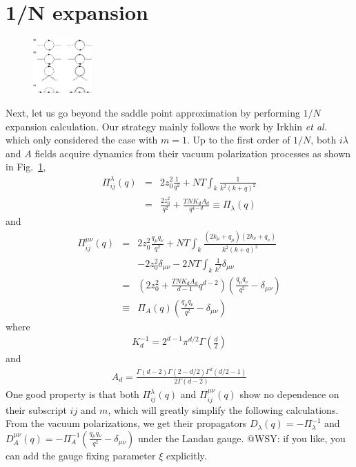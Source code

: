 \documentclass[aps,twocolumn,superscriptaddress]{revtex4-1}
\newcommand{\bea}{\begin{eqnarray}}
\newcommand{\eea}{\end{eqnarray}}
\newcommand{\etal}{\textit{et al.{ }}}
\begin{document}
\section{1/N expansion}
\begin{figure}
\includegraphics[width=0.2\textwidth]{self.eps}
\caption{\label{fig:self}}
\end{figure}
Next, let us go
beyond the saddle point approximation by performing $1/N$ expansion calculation. Our strategy mainly follows the work by
Irkhin \etal \cite{irkhin1996} which only considered the case with $m=1$. Up to the first order of $1/N$, both
$i\lambda$ and $A$ fields acquire dynamics from their vacuum polarization processes as shown in Fig.~\ref{fig:self},
\bea \Pi_{ij}^\lambda(q)&=&2z_0^2\frac{1}{q^2} + NT\int_k \frac{1}{k^2(k+q)^2} \nonumber\\
                        &=&\frac{2z_0^2}{q^2}+\frac{TNK_dA_d}{q^{4-d}} \equiv \Pi_\lambda(q) \eea and \bea
\Pi_{ij}^{\mu\nu}(q) &=& 2z_0^2 \frac{q_\mu q_\nu}{q^2} + NT\int_k \frac{(2k_\mu+q_\mu)(2k_\nu+q_\nu)}{k^2(k+q)^2}
\nonumber\\ && - 2z_0^2 \delta_{\mu\nu} -2NT\int_k \frac{1}{k^2}\delta_{\mu\nu}  \nonumber\\
            &=&\left(2z_0^2+\frac{TNK_dA_d}{d-1} q^{d-2}\right)\left(\frac{q_\mu q_\nu}{q^2}-\delta_{\mu\nu}\right)
\nonumber\\ &\equiv& \Pi_A(q)\left(\frac{q_\mu q_\nu}{q^2}-\delta_{\mu\nu}\right) \eea where \bea
K_d^{-1}=2^{d-1}\pi^{d/2}\Gamma\left(\frac{d}{2}\right) \eea and \bea
A_d=\frac{\Gamma(d-2)\Gamma(2-d/2)\Gamma^2(d/2-1)}{2\Gamma(d-2)} \eea One good property is that both
$\Pi_{ij}^\lambda(q)$ and $\Pi_{ij}^{\mu\nu}(q)$ show no dependence on their subscript $ij$ and $m$, which will greatly
simplify the following calculations. From the vacuum polarizations, we get their propagators
$D_\lambda(q)=-\Pi_\lambda^{-1}$ and $D_A^{\mu\nu}(q)=-\Pi_A^{-1}\left(\frac{q_\mu q_\nu}{q^2}-\delta_{\mu\nu}\right)$
under the Landau gauge. {\color{red} @WSY: if you like, you can add the gauge fixing parameter $\xi$ explicitly.}
\end{document}
